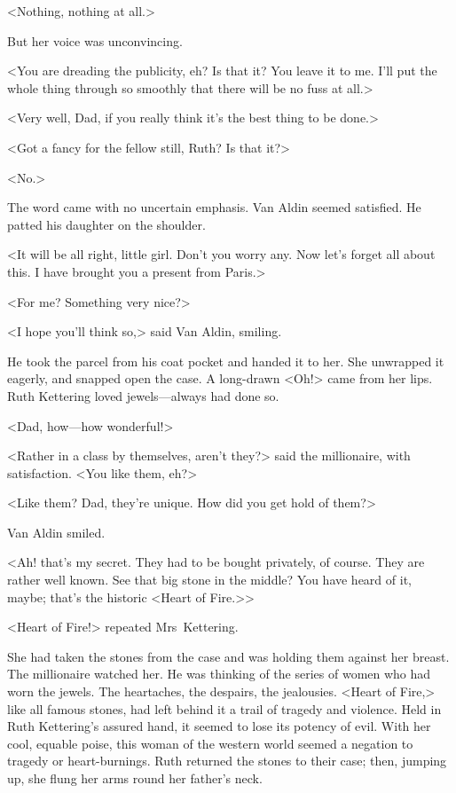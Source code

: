 <Nothing, nothing at all.>

But her voice was unconvincing.

<You are dreading the publicity, eh? Is that it? You leave it to me. I'll put the whole thing through so smoothly that there will be no fuss at all.>

<Very well, Dad, if you really think it's the best thing to be done.>

<Got a fancy for the fellow still, Ruth? Is that it?>

<No.>

The word came with no uncertain emphasis. Van Aldin seemed satisfied. He patted his daughter on the shoulder.

<It will be all right, little girl. Don't you worry any. Now let's forget all about this. I have brought you a present from Paris.>

<For me? Something very nice?>

<I hope you'll think so,> said Van Aldin, smiling.

He took the parcel from his coat pocket and handed it to her. She unwrapped it eagerly, and snapped open the case. A long-drawn <Oh!> came from her lips. Ruth Kettering loved jewels—always had done so.

<Dad, how—how wonderful!>

<Rather in a class by themselves, aren't they?> said the millionaire, with satisfaction. <You like them, eh?>

<Like them? Dad, they're unique. How did you get hold of them?>

Van Aldin smiled.

<Ah! that's my secret. They had to be bought privately, of course. They are rather well known. See that big stone in the middle? You have heard of it, maybe; that's the historic <Heart of Fire.>>

<Heart of Fire!> repeated Mrs~Kettering.

She had taken the stones from the case and was holding them against her breast. The millionaire watched her. He was thinking of the series of women who had worn the jewels. The heartaches, the despairs, the jealousies. <Heart of Fire,> like all famous stones, had left behind it a trail of tragedy and violence. Held in Ruth Kettering's assured hand, it seemed to lose its potency of evil. With her cool, equable poise, this woman of the western world seemed a negation to tragedy or heart-burnings. Ruth returned the stones to their case; then, jumping up, she flung her arms round her father's neck.

